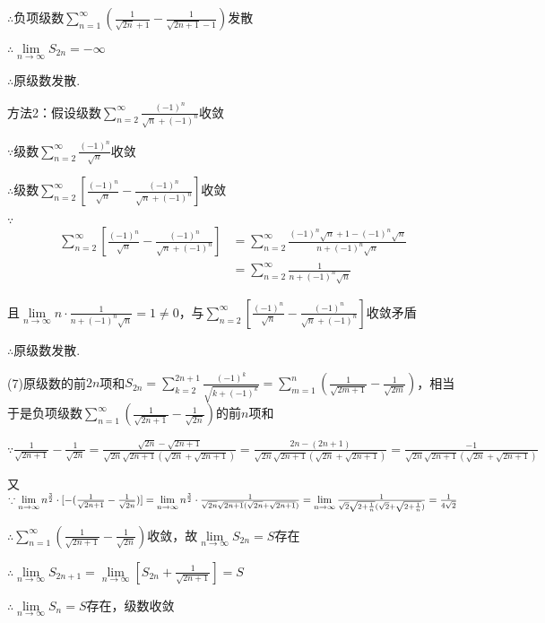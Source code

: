 \documentclass[12pt,UTF8]{ctexart}
\newcommand\Lim[0]{\lim\limits_{n\rightarrow\infty}}
\begin{document}
\begin{enumerate}
$\therefore$负项级数$\sum_{n=1}^\infty(\frac1{\sqrt{2n}+1}-\frac1{\sqrt{2n+1}-1})$发散

$\therefore\lim\limits_{n\rightarrow\infty}S_{2n}=-\infty$
%
%

$\therefore$原级数发散.

方法2：假设级数$\sum_{n=2}^\infty\frac{(-1)^n}{\sqrt n+(-1)^n}$收敛

$\because$级数$\sum_{n=2}^\infty\frac{(-1)^n}{\sqrt n}$收敛

$\therefore$级数$\sum_{n=2}^\infty[\frac{(-1)^n}{\sqrt n}-\frac{(-1)^n}{\sqrt n+(-1)^n}]$收敛

$\because$
\[\begin{aligned}
\sum_{n=2}^\infty[\frac{(-1)^n}{\sqrt n}-\frac{(-1)^n}{\sqrt n+(-1)^n}]&=\sum_{n=2}^\infty\frac{(-1)^n\sqrt n+1-(-1)^n\sqrt n}{n+(-1)^n\sqrt n}\\
&=\sum_{n=2}^\infty\frac{1}{n+(-1)^n\sqrt n}
\end{aligned}\]


且$\lim\limits_{n\rightarrow\infty}n\cdot\frac{1}{n+(-1)^n\sqrt n}=1\neq0$，与$\sum_{n=2}^\infty[\frac{(-1)^n}{\sqrt n}-\frac{(-1)^n}{\sqrt n+(-1)^n}]$收敛矛盾

$\therefore$原级数发散.

(7)原级数的前$2n$项和$S_{2n}=\sum_{k=2}^{2n+1}\frac{(-1)^k}{\sqrt{k+(-1)^k}}=\sum_{m=1}^n(\frac1{\sqrt{2m+1}}-\frac1{\sqrt{2m}})$，相当于是负项级数$\sum_{n=1}^\infty(\frac1{\sqrt{2n+1}}-\frac1{\sqrt{2n}})$的前$n$项和

$\because\frac1{\sqrt{2n+1}}-\frac1{\sqrt{2n}}=\frac{\sqrt{2n}-\sqrt{2n+1}}{\sqrt{2n}\sqrt{2n+1}(\sqrt{2n}+\sqrt{2n+1})}=\frac{2n-(2n+1)}{\sqrt{2n}\sqrt{2n+1}(\sqrt{2n}+\sqrt{2n+1})}=\frac{-1}{\sqrt{2n}\sqrt{2n+1}(\sqrt{2n}+\sqrt{2n+1})}$

又$\because\Lim n^{\frac32}\cdot[-(\frac1{\sqrt{2n+1}}-\frac1{\sqrt{2n}})]=\Lim n^{\frac32}\cdot\frac1{\sqrt{2n}\sqrt{2n+1}(\sqrt{2n}+\sqrt{2n+1})}=\Lim\frac1{\sqrt{2}\sqrt{2+\frac1n}(\sqrt{2}+\sqrt{2+\frac1n})}\\
=\frac1{4\sqrt2}$

$\therefore\sum_{n=1}^\infty(\frac1{\sqrt{2n+1}}-\frac1{\sqrt{2n}})$收敛，故$\Lim S_{2n}=S$存在

$\therefore\Lim S_{2n+1}=\Lim[S_{2n}+\frac1{\sqrt{2n+1}}]=S$

$\therefore\Lim S_n=S$存在，级数收敛


\end{enumerate}
\end{document}
